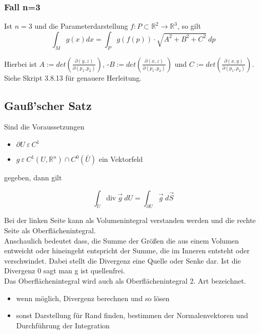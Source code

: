 \subsubsection{Fall n=3}
Ist $n=3$ und die Parameterdarstellung $f: P\subset \mathbb{R}^2 \to \mathbb{R}^3$, so gilt 
\begin{equation}
    \int_M g(x) dx = \int_P g(f(p))\cdot\sqrt{A^2+B^2+C^2} \ dp
\end{equation}

Hierbei ist $ A := det(\frac{\partial (y,z)}{\partial (p_1, p_2)})$,
            $ \textbf{-}B := det(\frac{\partial (x,z)}{\partial (p_1, p_2)})$
            und $ C := det(\frac{\partial (x,y)}{\partial (p_1, p_2)})$.\\
Siehe Skript 3.8.13 für genauere Herleitung.

\subsection{Gauß'scher Satz}
Sind die Voraussetzungen 
\begin{itemize}
    \item $\partial U \ \varepsilon \ C^1$
    \item $g \ \varepsilon \ C^1(U,\mathbb{R}^n) \cap C^0(\bar{U})$ ein Vektorfeld
\end{itemize}
gegeben, dann gilt

\begin{equation}
    \int_U \text{div}\ \vec{g} \ dU = \int_{\partial U} \vec{g} \ d\overrightarrow{S}
\end{equation}

\noindent Bei der linken Seite kann als Volumenintegral verstanden werden und die rechte Seite als 
Oberflächenintegral.\\

\noindent Anschaulich bedeutet dass, die Summe der Größen die aus einem Volumen entweicht oder hineingeht entspricht der Summe, die im Inneren entsteht oder verschwindet. Dabei stellt die Divergenz eine Quelle oder Senke dar. Ist die Divergenz 0 sagt man g ist quellenfrei.\\
Das Oberflächenintegral wird auch als Oberflächenintegral 2. Art bezeichnet.\\
\begin{itemize}
    \item wenn möglich, Divergenz berechnen und so lösen
    \item sonst Darstellung für Rand finden, bestimmen der Normalenvektoren und Durchführung der Integration
\end{itemize}


